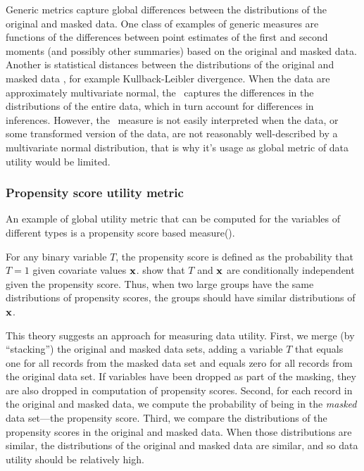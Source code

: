 \documentclass[12pt]{article}
\begin{document}
Generic metrics capture global differences between the distributions of the original and masked data. 
One class of examples of generic measures are functions of the differences between point estimates of the first and second moments (and possibly other summaries) based on the original and masked data. Another is statistical distances between the distributions of the original and masked data \cite{dfks02, gks06}, for example Kullback-Leibler divergence.  When the data are approximately multivariate normal, the \KL\ captures the differences in the distributions of the entire data,
which in turn account for differences in inferences. 
However, the \KL\ measure is not easily
interpreted when the data, or some transformed version of the
data, are not reasonably well-described by a multivariate normal
distribution, that is why it's  usage as  global metric of data utility
would be limited.



\subsubsection{Propensity score utility metric}

An example of global utility metric that can be computed for the variables of different types is a propensity score based measure(\cite{propen}).

For any binary variable $T$, the propensity
score is defined as the probability that $T=1$ given covariate values $\textbf{x}$. \cite{rr83} show
that $T$ and $\textbf{x}$ are conditionally independent given the propensity
score. Thus, when two large groups have the same distributions of
propensity scores, the groups should have similar distributions of $\textbf{x}$.

This theory suggests an approach for measuring data utility.
First, we merge (by ``stacking'') the original and masked data sets, adding a variable $T$ that equals one for all records from the masked data set and equals zero for all records from the original data set. If
variables have been dropped as part of the masking, they are also
dropped in computation of propensity scores.  Second, for each record
in the original and masked data, we compute the probability of being
in the \textit{masked} data set---the propensity
score. Third, we compare the distributions of the propensity scores in
the original and masked data.  When those distributions are similar,
the distributions of the original and masked data are similar, and so
data utility should be relatively high.
\end{document}
